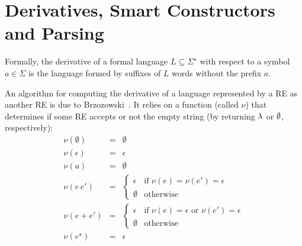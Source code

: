 \documentclass[fleqn,10pt]{SelfArx} %
\theoremstyle{definition}
\newcommand{\C}[1]{\red{\mathsf{#1}}}
\begin{document}
\section{Derivatives, Smart Constructors and Parsing}\label{sec:deriv}

Formally, the derivative of a formal language $L\subseteq
\Sigma^\star$ with respect to a symbol $a\in\Sigma$ is the language
formed by suffixes of $L$ words without the prefix $a$.

An algorithm for computing the derivative of a language represented by
a RE as another RE is due to Brzozowski~\cite{Brzozowski1964}. It
relies on a function (called $\nu$) that determines if some RE accepts
or not the empty string (by returning \ensuremath{\C{\lambda}} or \ensuremath{\C{\emptyset}}, respectively):
\[
    \begin{array}{lcl}
         \nu(\emptyset) & = & \emptyset \\
         \nu(\epsilon)    & = & \epsilon \\
         \nu(a)                & = & \emptyset \\
         \nu(e\,e')           & = & \left\{
                                                 \begin{array}{ll}
                                                      \epsilon &
                                                                 \text{if
                                                                 }\nu(e)
                                                                 =
                                                                 \nu(e')
                                                                 =
                                                                 \epsilon
                                                   \\
                                                   \emptyset &
                                                               \text{otherwise}
                                                 \end{array}
                                             \right. \\
         \nu(e + e')  & = & \left\{
                                         \begin{array}{ll}
                                              \epsilon & \text{if
                                                         }\nu(e) =
                                                         \epsilon
                                                         \text{ or
                                                         }\nu(e') =
                                                         \epsilon \\
                                              \emptyset & \text{otherwise}
                                         \end{array}
                                      \right. \\
         \nu(e^\star) & = & \epsilon
    \end{array}
\]
\end{document}
